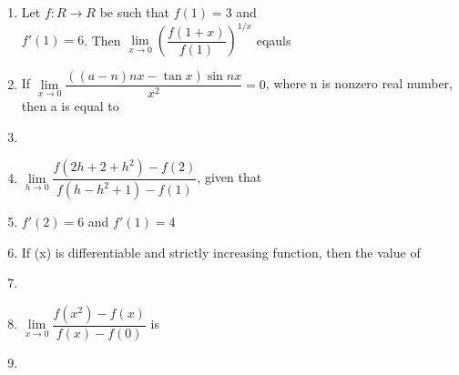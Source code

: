 \begin{enumerate}[label=\arabic*.,ref=\thesubsection.\theenumi]
\item Let $f:R \to R$ be such that $f(1)=3$ and \\$f'(1)=6$. Then $\lim\limits_{x \to 0}\left(\dfrac{f(1+x)}{f(1)}\right)^{1/x}$ eqauls \\
\begin{itemize}
\end{itemize}

\item If $\lim\limits_{x \to 0}\dfrac{((a-n)nx-\tan x)\sin nx}{x^2}=0$, where n is nonzero real number, then a is equal to
\begin{itemize}
\end{itemize}

\item[~] \item $\lim\limits_{h \to 0}\dfrac{f(2h+2+h^2)-f(2)}{f(h-h^2+1)-f(1)}$, given that \\ \item[~]$f'(2)=6$ and $f'(1)=4$
\begin{itemize}
\end{itemize}

\item If (x) is differentiable and strictly increasing function, then the value of \item[~] \item[~]$\lim\limits_{x \to 0}\dfrac{f(x^2)-f(x)}{f(x)-f(0)}$ is \item[~]
\begin{itemize}
\end{itemize}


\end{enumerate}

